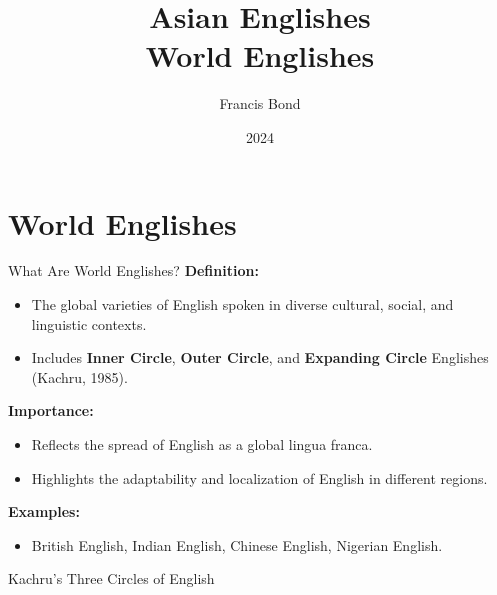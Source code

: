 \documentclass{beamer}
\title[Asian Englishes]{Asian Englishes\\ World Englishes}
\author[Francis Bond]{Francis Bond}
\date{2024}
\begin{document}
\begin{frame}
    \titlepage
\end{frame}


\section{World Englishes}


\begin{frame}{What Are World Englishes?}
\textbf{Definition:}
\begin{itemize}
    \item The global varieties of English spoken in diverse cultural, social, and linguistic contexts.
    \item Includes \textbf{Inner Circle}, \textbf{Outer Circle}, and \textbf{Expanding Circle} Englishes (Kachru, 1985).
\end{itemize}

\textbf{Importance:}
\begin{itemize}
    \item Reflects the spread of English as a global lingua franca.
    \item Highlights the adaptability and localization of English in different regions.
\end{itemize}

\textbf{Examples:}
\begin{itemize}
    \item British English, Indian English, Chinese English, Nigerian English.
\end{itemize}
\end{frame}


\begin{frame}{Kachru's Three Circles of English}
\centering
{}
\end{frame}
\end{document}
